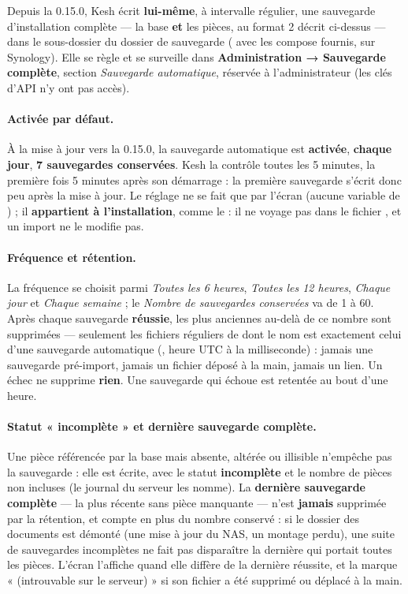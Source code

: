 \documentclass[a4paper,11pt,oneside]{article}
\begin{document}
Depuis la 0.15.0, Kesh écrit \textbf{lui-même}, à intervalle régulier, une sauvegarde d'installation complète --- la base \textbf{et} les pièces, au format 2 décrit ci-dessus --- dans le sous-dossier  du dossier de sauvegarde ( avec les compose fournis,  sur Synology). Elle se règle et se surveille dans \textbf{Administration → Sauvegarde complète}, section \emph{Sauvegarde automatique}, réservée à l'administrateur (les clés d'API n'y ont pas accès).

\paragraph{Activée par défaut.} À la mise à jour vers la 0.15.0, la sauvegarde automatique est \textbf{activée}, \textbf{chaque jour}, \textbf{7 sauvegardes conservées}. Kesh la contrôle toutes les 5 minutes, la première fois 5 minutes après son démarrage : la première sauvegarde s'écrit donc peu après la mise à jour. Le réglage ne se fait que par l'écran (aucune variable de ) ; il \textbf{appartient à l'installation}, comme le  : il ne voyage pas dans le fichier , et un import ne le modifie pas.

\paragraph{Fréquence et rétention.} La fréquence se choisit parmi \emph{Toutes les 6 heures}, \emph{Toutes les 12 heures}, \emph{Chaque jour} et \emph{Chaque semaine} ; le \emph{Nombre de sauvegardes conservées} va de 1 à 60. Après chaque sauvegarde \textbf{réussie}, les plus anciennes au-delà de ce nombre sont supprimées --- seulement les fichiers réguliers de  dont le nom est exactement celui d'une sauvegarde automatique (, heure UTC à la milliseconde) : jamais une sauvegarde pré-import, jamais un fichier déposé à la main, jamais un lien. Un échec ne supprime \textbf{rien}. Une sauvegarde qui échoue est retentée au bout d'une heure.

\paragraph{Statut « incomplète » et dernière sauvegarde complète.} Une pièce référencée par la base mais absente, altérée ou illisible n'empêche pas la sauvegarde : elle est écrite, avec le statut \textbf{incomplète} et le nombre de pièces non incluses (le journal du serveur les nomme). La \textbf{dernière sauvegarde complète} --- la plus récente sans pièce manquante --- n'est \textbf{jamais} supprimée par la rétention, et compte en plus du nombre conservé : si le dossier des documents est démonté (une mise à jour du NAS, un montage perdu), une suite de sauvegardes incomplètes ne fait pas disparaître la dernière qui portait toutes les pièces. L'écran l'affiche quand elle diffère de la dernière réussite, et la marque « (introuvable sur le serveur) » si son fichier a été supprimé ou déplacé à la main.
\end{document}
